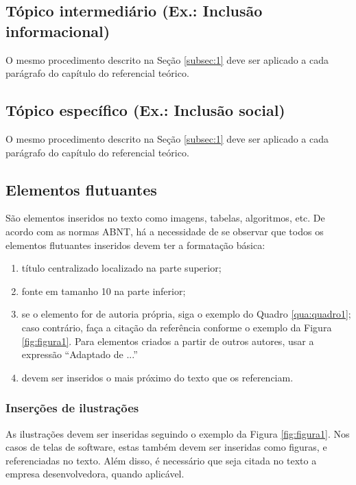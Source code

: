 \subsection{\esp Tópico intermediário (Ex.: Inclusão informacional) }
O mesmo procedimento descrito na Seção \ref{subsec:1} deve ser aplicado a cada parágrafo do capítulo do referencial teórico.

\subsection{\esp Tópico específico (Ex.: Inclusão social) }
O mesmo procedimento descrito na Seção \ref{subsec:1} deve ser aplicado a cada parágrafo do capítulo do referencial teórico.




\subsection{\esp Elementos flutuantes}

São elementos inseridos no texto como imagens, tabelas, algoritmos, etc.
De acordo com as normas ABNT, há a necessidade de se observar que todos os elementos flutuantes inseridos devem ter a formatação básica:

\begin{enumerate} [label={\alph*})]
 \item título centralizado localizado na parte superior; 
 \item fonte em tamanho 10 na parte inferior;
 \item se o elemento for de autoria própria, siga o exemplo do Quadro \ref{qua:quadro1}; caso contrário, faça a citação da referência conforme o exemplo da Figura \ref{fig:figura1}. Para elementos criados a partir de outros autores, usar a expressão  ``Adaptado de ...'' 
 \item devem ser inseridos o mais próximo do texto que os referenciam.
\end{enumerate}


\subsubsection{\esp Inserções de ilustrações}

As ilustrações devem ser inseridas seguindo o exemplo da Figura \ref{fig:figura1}. Nos casos de telas de software, estas também devem ser inseridas como figuras, e referenciadas no texto. Além disso, é necessário que seja citada no texto a empresa desenvolvedora, quando aplicável. 

